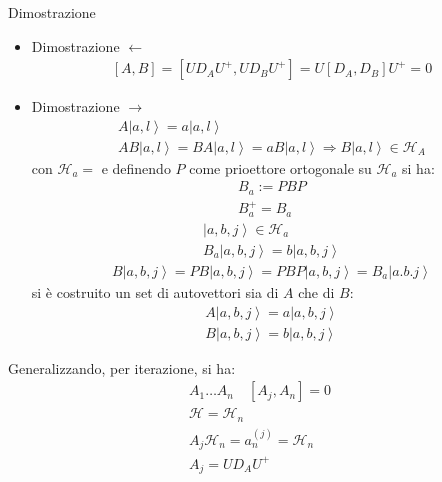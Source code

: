 Dimostrazione
\begin{itemize}
\item Dimostrazione $\leftarrow$
\begin{equation}\begin{split}
\left[A,B\right]=\left[UD_AU^+,UD_BU^+\right]=U\left[D_A,D_B\right]U^+=0
\end{split}\end{equation}

\item Dimostrazione $\rightarrow$
\begin{equation}\begin{split}
A\left |a,l \right\rangle=a\left |a,l \right\rangle \\
AB\left |a,l \right\rangle=BA\left |a,l \right\rangle=aB\left |a,l \right\rangle \Longrightarrow B\left |a,l \right\rangle \in \mathcal{H}_A
\end{split}\end{equation}
con $\mathcal{H}_a=$ e definendo $P$ come prioettore ortogonale su $\mathcal{H}_a$ si ha:
\begin{equation}\begin{split}
B_a:=PBP \\
B_a^+=B_a
\end{split}\end{equation}
\begin{equation}\begin{split}
\left |a,b,j \right\rangle\in\mathcal{H}_a \\
B_a\left |a,b,j \right\rangle=b\left |a,b,j \right\rangle
\end{split}\end{equation}
\begin{equation}\begin{split}
B\left |a,b,j \right\rangle=PB\left |a,b,j \right\rangle=PBP\left |a,b,j \right\rangle=B_a\left |a.b.j \right\rangle
\end{split}\end{equation}
si è costruito un set di autovettori sia di $A$ che di $B$:
\begin{equation}\begin{split}
A\left |a,b,j \right\rangle=a\left |a,b,j \right\rangle \\
B\left |a,b,j \right\rangle=b\left |a,b,j \right\rangle
\end{split}\end{equation}
\end{itemize}

Generalizzando, per iterazione, si ha:
\begin{equation}\begin{split}
A_1\dots A_n \quad \left[A_j,A_n\right]=0 \\
\mathcal{H}=\mathcal{H}_n \\
A_j\mathcal{H}_n=a_n^{\left(j\right)}=\mathcal{H}_n \\
A_j=UD_AU^+
\end{split}\end{equation}

